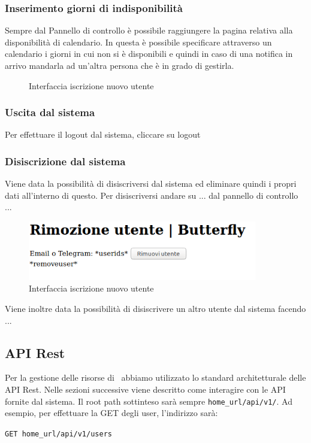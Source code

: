 \subsubsection{Inserimento giorni di indisponibilità}\label{indisponibilita}
Sempre dal Pannello di controllo è possibile raggiungere la pagina relativa alla disponibilità di calendario. 
In questa è possibile specificare attraverso un calendario i giorni in cui non si è disponibili e quindi in caso di una notifica in arrivo mandarla ad un'altra persona che è in grado di gestirla.
\begin{figure}[H]
	\centering
	\caption{Interfaccia iscrizione nuovo utente}
\end{figure}

\subsubsection{Uscita dal sistema}
Per effettuare il logout dal sistema, cliccare su logout

\subsubsection{Disiscrizione dal sistema}
Viene data la possibilità di disiscriversi dal sistema ed eliminare quindi i propri dati all'interno di questo.
Per disiscriversi andare su ... dal pannello di controllo ...
\begin{figure}[H]
	\centering
	\includegraphics[width=10cm]{img/rimozione_1.png} %
	\caption{Interfaccia iscrizione nuovo utente}
\end{figure}
Viene inoltre data la possibilità di disiscrivere un altro utente dal sistema facendo ...


\subsection{API Rest}\label{APIRest}
\newcommand{\homeUrl}{home\_url}

Per la gestione delle risorse di \progetto\ abbiamo utilizzato lo standard architetturale delle API Rest.
Nelle sezioni successive viene descritto come interagire con le API fornite dal sistema.
Il root path sottinteso sarà sempre \texttt{\homeUrl/api/v1/}.
Ad esempio, per effettuare la GET degli user, l'indirizzo sarà:
\begin{center}
    \texttt{GET \homeUrl/api/v1/users}
\end{center}

